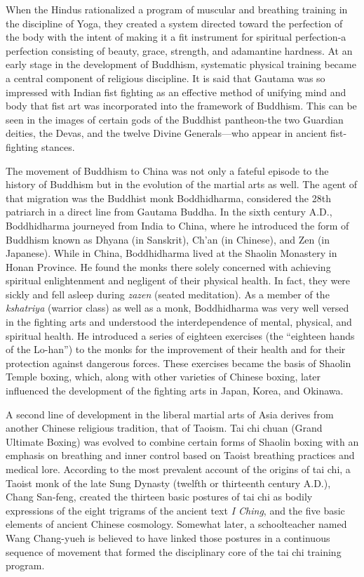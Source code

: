 When the Hindus rationalized a program of muscular and breathing training in the discipline of Yoga, they created a system directed toward the perfection of the body with the intent of making it a fit instrument for spiritual perfection-a perfection consisting of beauty, grace, strength, and adamantine hardness. At an early stage in the development of Buddhism, systematic physical training became a central component of religious discipline. It is said that Gautama was so impressed with Indian fist fighting as an effective method of unifying mind and body that fist art was incorporated into the framework of Buddhism. This can be seen in the images of certain gods of the Buddhist pantheon-the two Guardian deities, the Devas, and the twelve Divine Generals---who appear in ancient fist-fighting stances. 

The movement of Buddhism to China was not only a fateful episode to the history of Buddhism but in the evolution of the martial arts as well. The agent of that migration was the Buddhist monk Boddhidharma, considered the 28th patriarch in a direct line from Gautama Buddha. In the sixth century A.D., Boddhidharma journeyed from India to China, where he introduced the form of Buddhism known as Dhyana (in Sanskrit), Ch'an (in Chinese), and Zen (in Japanese). While in China, Boddhidharma lived at the Shaolin Monastery in Honan Province. He found the monks there solely concerned with achieving spiritual enlightenment and negligent of their physical health. In fact, they were sickly and fell asleep during \emph{zazen} (seated meditation). As a member of the \emph{kshatriya} (warrior class) as well as a monk, Boddhidharma was very well versed in the fighting arts and understood the interdependence of mental, physical, and spiritual health. He introduced a series of eighteen exercises (the ``eighteen hands of the Lo-han'') to the monks for the improvement of their health and for their protection against dangerous forces. These exercises became the basis of Shaolin Temple boxing, which, along with other varieties of Chinese boxing, later influenced the development of the fighting arts in Japan, Korea, and Okinawa.

A second line of development in the liberal martial arts of Asia derives from another Chinese religious tradition, that of Taoism. Tai chi chuan (Grand Ultimate Boxing) was evolved to combine certain forms of Shaolin boxing with an emphasis on breathing and inner control based on Taoist breathing practices and medical lore. According to the most prevalent account of the origins of tai chi, a Taoist monk of the late Sung Dynasty (twelfth or thirteenth century A.D.), Chang San-feng, created the thirteen basic postures of tai chi as bodily expressions of the eight trigrams of the ancient text \emph{I Ching}, and the five basic elements of ancient Chinese cosmology. Somewhat later, a schoolteacher named Wang Chang-yueh is believed to have linked those postures in a continuous sequence of movement that formed the disciplinary core of the tai chi training program. 

